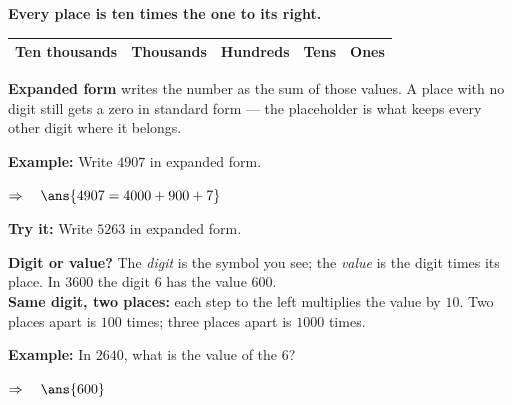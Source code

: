 \documentclass[12pt]{article}
\begin{document}


\begin{formulabox}
\textbf{Every place is ten times the one to its right.}
\par\medskip
\begin{center}
{\small\begin{tabular}{|P|P|P|P|P|}
\hline
\textbf{Ten thousands} & \textbf{Thousands} & \textbf{Hundreds} &
\textbf{Tens} & \textbf{Ones} \\ \hline
\end{tabular}}
\end{center}
\par\medskip
\textbf{Expanded form} writes the number as the sum of those values. A place
with no digit still gets a zero in standard form --- the placeholder is what
keeps every other digit where it belongs.
\end{formulabox}

\begin{examplebox}
\textbf{Example:} Write $4907$ in expanded form.

$\Rightarrow\quad \ans{4907 = 4000 + 900 + 7}$
\end{examplebox}

\begin{tryitbox}
\textbf{Try it:} Write $5263$ in expanded form.\\[2pt]
\end{tryitbox}


\begin{formulabox}
\textbf{Digit or value?} The \emph{digit} is the symbol you see; the
\emph{value} is the digit times its place. In $3600$ the digit $6$ has the
value $600$.\\[3pt]
\textbf{Same digit, two places:} each step to the left multiplies the value by
$10$. Two places apart is $100$ times; three places apart is $1000$ times.
\end{formulabox}

\begin{examplebox}
\textbf{Example:} In $2640$, what is the value of the $6$?

$\Rightarrow\quad \ans{600}$
\end{examplebox}
\end{document}
